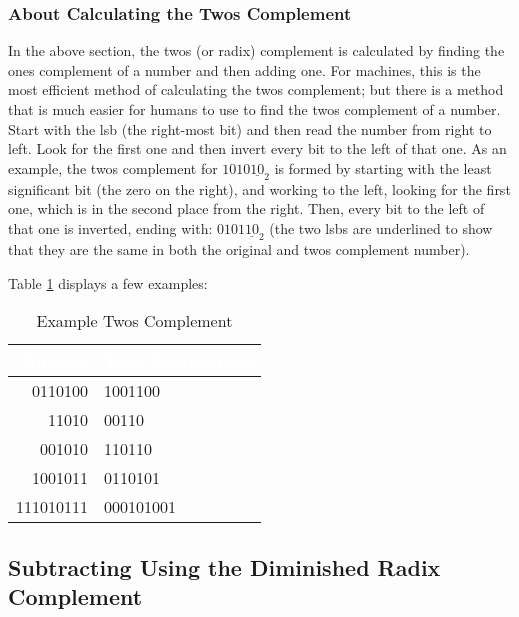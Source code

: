\subsubsection{About Calculating the Twos Complement}
\label{MO:subsub:about_calculating_twos_complement}

In the above section, the twos (or radix) complement is calculated by finding the ones complement of a number and then adding one. For machines, this is the most efficient method of calculating the twos complement; but there is a method that is much easier for humans to use to find the twos complement of a number. Start with the \gls{lsb} (the right-most bit) and then read the number from right to left. Look for the first one and then invert every bit to the left of that one. As an example, the twos complement for $ 1010\underline{10}_2 $ is formed by starting with the least significant bit (the zero on the right), and working to the left, looking for the first one, which is in the second place from the right. Then, every bit to the left of that one is inverted, ending with: $ 0101\underline{10}_2 $ (the two \glspl{lsb} are underlined to show that they are the same in both the original and twos complement number).

Table \ref{MO:tab:example_twos_comp} displays a few examples:

\begin{table}[H]
  \sffamily
  \newcommand{\head}[1]{\textcolor{white}{\textbf{#1}}}    
  \begin{center}
    \begin{tabular}{ r l } 
      \hline
      \rowcolor{black!75}
      {\head{Number}} & {\head{Twos Complement}} \\
      \hline
      0110100   & 1001100   \\
      11010     & 00110     \\
      001010    & 110110    \\
      1001011   & 0110101   \\
      111010111 & 000101001 \\
      \hline
    \end{tabular}
  \end{center}
  \caption{Example Twos Complement}
  \label{MO:tab:example_twos_comp}
\end{table} 

\subsection{Subtracting Using the Diminished Radix Complement }
\label{MO:sub:subtracting_using_diminished_radix}

